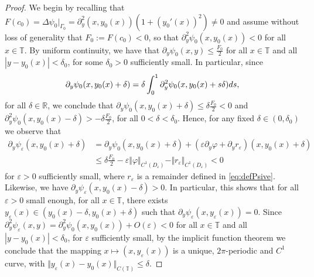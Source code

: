 \documentclass[10pt,a4paper]{amsart}
\newcommand{\R}{\mathbb{R}}
\newcommand{\rmd}{{\rm d}}
\newcommand{\ve}{\varepsilon}
\begin{document}
\begin{proof}
We begin by recalling that $F(c_0)=\Delta\psi_0|_{\Gamma_0}= \partial_y^2(x,y_0(x))\left( 1 + (y_0'(x))^2\right)\neq 0$ and assume without loss of generality that $F_0:=F(c_0)<0$, so that $\partial_y^2\psi_0(x,y_0(x))<0$ for all $x\in \mathbb{T}$. By uniform continuity, we have that $\partial_y\psi_0(x,y)\leq \frac{F_0}{2}$ for all $x\in \mathbb{T}$ and all $|y-y_0(x)|<\delta_0$, for some $\delta_0>0$ sufficiently small. In particular, since
\begin{align*}
\partial_y\psi_0(x,y_0(x) + \delta) = \delta\int_0^1 \partial_y^2\psi_0(x,y_0(x) + s\delta)\rmd s ,
\end{align*} 
for all $\delta\in \R$, we conclude that $\partial_y\psi_0(x,y_0(x)+\delta) \leq \delta \frac{F_0}{2} <0$ and $\partial_y^2\psi_0(x,y_0(x) - \delta) > -\delta\frac{F_0}{2}$, for all $0 < \delta < \delta_0$. Hence, for any fixed $\delta\in (0,\delta_0)$ we observe that
\begin{align*}
\partial_y\psi_{\ve}(x,y_0(x) +\delta) &= \partial_y\psi_0(x,y_0(x) +\delta) +\left( \ve\partial_y\varphi + \partial_y r_{\ve} \right)(x,y_0(x) +\delta) \\&
\leq \delta\frac{ F_0}{2} - \ve \Vert \varphi\Vert_{C^1(D_\ve)} - \Vert r_{\ve} \Vert_{C^1(D_\ve)} <0
\end{align*}
for $\ve>0$ sufficiently small, 
where $r_\ve$ is a remainder defined in \eqref{eq:defPsive}. Likewise, we have $\partial_y \psi_{\ve}(x,y_0(x) -\delta) >0$. In particular, this shows that for all $\ve>0$ small enough, for all $x\in\mathbb{T}$, there exists $y_{\ve}(x)\in (y_0(x)-\delta, y_0(x) + \delta)$ such that $\partial_y\psi_{\ve}(x,y_{\ve}(x))=0$. Since $\partial_y^2\psi_{\ve}(x,y) =\partial_y^2\psi_0(x,y_0(x)) +O(\ve) < 0$ for all $x\in \mathbb{T}$ and all $|y-y_0(x)|<\delta_0$, for $\ve$ sufficiently small, by the implicit function theorem we conclude that the mapping $x\mapsto (x,y_{\ve}(x))$ is a unique, $2\pi$-periodic and $C^1$ curve, with $\Vert y_\ve(x) - y_0(x) \Vert_{C(\mathbb{T})}\leq \delta$.


\end{proof}
\end{document}
